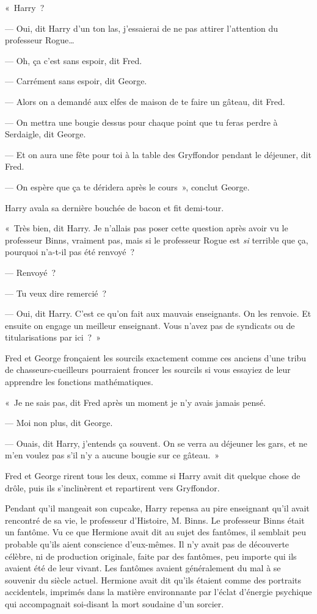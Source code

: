 «~Harry~?

--- Oui, dit Harry d'un ton las, j'essaierai de ne pas attirer l'attention du professeur Rogue…

--- Oh, ça c'est sans espoir, dit Fred.

--- Carrément sans espoir, dit George.

--- Alors on a demandé aux elfes de maison de te faire un gâteau, dit Fred.

--- On mettra une bougie dessus pour chaque point que tu feras perdre à Serdaigle, dit George.

--- Et on aura une fête pour toi à la table des Gryffondor pendant le déjeuner, dit Fred.

--- On espère que ça te déridera après le cours~», conclut George.

Harry avala sa dernière bouchée de bacon et fit demi-tour.

«~Très bien, dit Harry. Je n'allais pas poser cette question après avoir vu le professeur Binns, vraiment pas, mais si le professeur Rogue est \emph{si} terrible que ça, pourquoi n'a-t-il pas été renvoyé~?

--- Renvoyé~?

--- Tu veux dire remercié~?

--- Oui, dit Harry. C'est ce qu'on fait aux mauvais enseignants. On les renvoie. Et ensuite on engage un meilleur enseignant. Vous n'avez pas de syndicats ou de titularisations par ici~?~»

Fred et George fronçaient les sourcils exactement comme ces anciens d'une tribu de chasseurs-cueilleurs pourraient froncer les sourcils si vous essayiez de leur apprendre les fonctions mathématiques.

«~Je ne sais pas, dit Fred après un moment je n'y avais jamais pensé.

--- Moi non plus, dit George.

--- Ouais, dit Harry, j'entends ça souvent. On se verra au déjeuner les gars, et ne m'en voulez pas s'il n'y a aucune bougie sur ce gâteau.~»

Fred et George rirent tous les deux, comme si Harry avait dit quelque chose de drôle, puis ils s'inclinèrent et repartirent vers Gryffondor.

Pendant qu'il mangeait son cupcake, Harry repensa au pire enseignant qu'il avait rencontré de sa vie, le professeur d'Histoire, M. Binns. Le professeur Binns était un fantôme. Vu ce que Hermione avait dit au sujet des fantômes, il semblait peu probable qu'ils aient conscience d'eux-mêmes. Il n'y avait pas de découverte célèbre, ni de production originale, faite par des fantômes, peu importe qui ils avaient été de leur vivant. Les fantômes avaient généralement du mal à se souvenir du siècle actuel. Hermione avait dit qu'ils étaient comme des portraits accidentels, imprimés dans la matière environnante par l'éclat d'énergie psychique qui accompagnait soi-disant la mort soudaine d'un sorcier.

